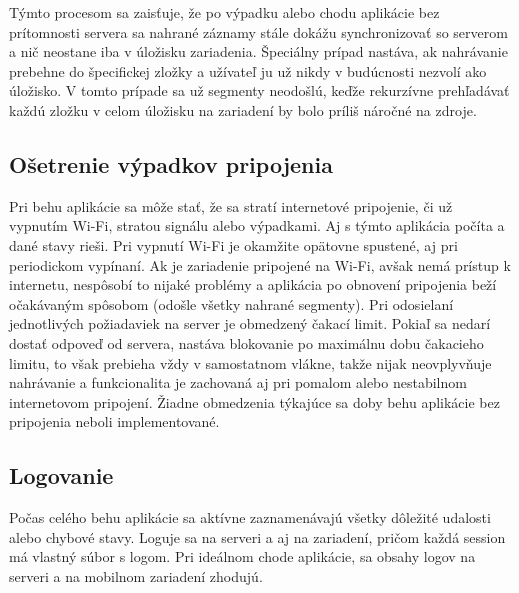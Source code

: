 Týmto procesom sa zaisťuje, že po výpadku alebo chodu aplikácie bez prítomnosti servera sa nahrané záznamy stále dokážu synchronizovať so serverom a nič neostane iba v úložisku zariadenia. Špeciálny prípad nastáva, ak nahrávanie prebehne do špecifickej zložky a užívateľ ju už nikdy v budúcnosti nezvolí ako úložisko. V tomto prípade sa už segmenty neodošlú, keďže rekurzívne prehľadávať každú zložku v celom úložisku na zariadení by bolo príliš náročné na zdroje.

\subsection{Ošetrenie výpadkov pripojenia}

Pri behu aplikácie sa môže stať, že sa stratí internetové pripojenie, či už vypnutím Wi-Fi, stratou signálu alebo výpadkami. Aj s týmto aplikácia počíta a dané stavy rieši. Pri vypnutí Wi-Fi je okamžite opätovne spustené, aj pri periodickom vypínaní. Ak je zariadenie pripojené na Wi-Fi, avšak nemá prístup k internetu, nespôsobí to nijaké problémy a aplikácia po obnovení pripojenia beží očakávaným spôsobom (odošle všetky nahrané segmenty). Pri odosielaní jednotlivých požiadaviek na server je obmedzený čakací limit. Pokiaľ sa nedarí dostať odpoveď od servera, nastáva blokovanie po maximálnu dobu čakacieho limitu, to však prebieha vždy v samostatnom vlákne, takže nijak neovplyvňuje nahrávanie a funkcionalita je zachovaná aj pri pomalom alebo nestabilnom internetovom pripojení. Žiadne obmedzenia týkajúce sa doby behu aplikácie bez pripojenia neboli implementované.

\subsection{Logovanie}

Počas celého behu aplikácie sa aktívne zaznamenávajú všetky dôležité udalosti alebo chybové stavy. Loguje sa na serveri a aj na zariadení, pričom každá session má vlastný súbor s logom. Pri ideálnom chode aplikácie, sa obsahy logov na serveri a na mobilnom zariadení zhodujú.

